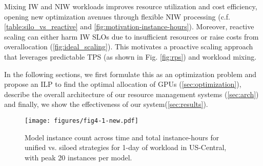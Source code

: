 \begin{mytextbox}

 Mixing IW and NIW workloads improves resource utilization and cost efficiency, opening new optimization avenues through flexible NIW processing (c.f. \autoref{table:silo_vs_reactive} and \autoref{fig:motivation-instance-hours}). Moreover, reactive scaling can either harm IW SLOs due to insufficient resources or raise costs from overallocation (\autoref{fig:ideal_scaling}). This motivates a proactive scaling approach that leverages predictable TPS (as shown in Fig. \autoref{fig:rps}) and workload mixing.
\end{mytextbox}

In the following sections, we first formulate this as an optimization problem and propose an ILP to find the optimal allocation of GPUs (\autoref{sec:optimization}), describe the overall architecture of our resource management systems (\autoref{sec:arch}) and finally, we show the effectiveness of our system(\autoref{sec:results}). 



\begin{figure}[t!]
    \centering
\texttt{[image: figures/fig4-1-new.pdf]}  \caption{Model instance count across time and total instance-hours for unified vs. siloed strategies for 1-day of workload in US-Central, with peak 20 instances per model. 
}
    \begin{comment}
    \ysnote{Rename model names as Llama 2, Bloom, Llama 3.1, Llama 32; }
      \ysnote{
        rename "heuristic" as "unified".Show the AUC value (instance hours) as a text value within the plot for Unified and siloed. Minor grid lines on X and Y axis.}
        \end{comment}
    \label{fig:motivation-instance-hours}
\end{figure}

